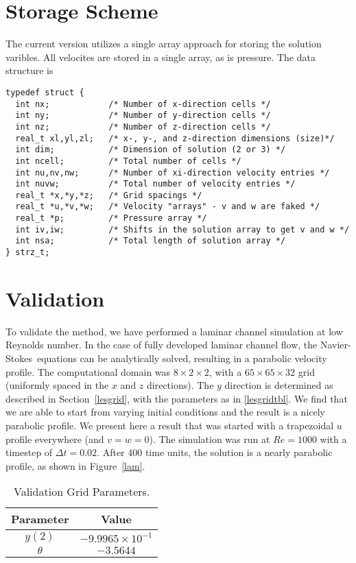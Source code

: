 \documentclass[10pt]{article}
\newcommand{\NS}{\hbox{Navier}-\hbox{Stokes}\ }
\begin{document}
\section{Storage Scheme}
The current version utilizes a single array approach for storing the
solution varibles.  All velocites are stored in a single array, as is
pressure.  The data structure is 
\begin{verbatim}
typedef struct {
  int nx;            /* Number of x-direction cells */
  int ny;            /* Number of y-direction cells */
  int nz;            /* Number of z-direction cells */
  real_t xl,yl,zl;   /* x-, y-, and z-direction dimensions (size)*/
  int dim;           /* Dimension of solution (2 or 3) */
  int ncell;         /* Total number of cells */
  int nu,nv,nw;      /* Number of xi-direction velocity entries */
  int nuvw;          /* Total number of velocity entries */
  real_t *x,*y,*z;   /* Grid spacings */
  real_t *u,*v,*w;   /* Velocity "arrays" - v and w are faked */
  real_t *p;         /* Pressure array */
  int iv,iw;         /* Shifts in the solution array to get v and w */
  int nsa;           /* Total length of solution array */
} strz_t;
\end{verbatim}

\section{Validation}\label{approxfactval}
To validate the method, we have performed a laminar channel simulation
at low Reynolds number.  In the case of fully developed laminar
channel flow, the \NS equations can be analytically solved, resulting
in a parabolic velocity profile.  The computational domain was
$8\times 2 \times 2$, with a $65\times 65 \times 32$ grid (uniformly
spaced in the $x$ and $z$ directions).  The $y$ direction is
determined as described in Section~\ref{lesgrid}, with the parameters
as in \autoref{lesgridtbl}.  We find that we are able to start from
varying initial conditions and the result is a nicely parabolic
profile. We present here a result that was started with a trapezoidal
$u$ profile everywhere (and $v=w=0$).  The simulation was run at
$Re=1000$ with a timestep of $\Delta t=0.02$.  After 400 time units,
the solution is a nearly parabolic profile, as shown in
Figure~\ref{lam}.
%
\begin{table}[t]
\caption{Validation Grid Parameters.}\label{lesgridtbl}
\begin{center}
\begin{tabular}{|c|c|}\hline
Parameter  & Value\\ \hline
$y(2)$ & $-9.9965\times 10^{-1}$ \\ \hline 
$\theta$ & $-3.5644$\\ \hline
\end{tabular}
\end{center}
\end{table}
\end{document}
